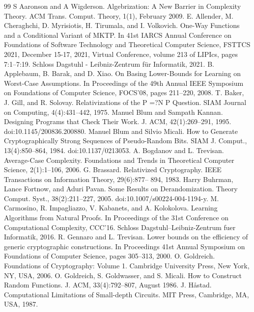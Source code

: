 \documentclass[10pt,a4paper]{article}
\begin{document}
\begin{thebibliography}{99}
 S Aaronson and A Wigderson. Algebrization: A New Barrier in Complexity Theory. ACM Trans. Comput. Theory, 1(1), February 2009.
 E. Allender, M. Cheraghchi, D. Myrisiotis, H. Tirumala, and I. Volkovich. One-Way Functions and a Conditional Variant of MKTP. In 41st IARCS Annual Conference on Foundations of Software Technology and Theoretical Computer Science, FSTTCS 2021, December 15-17, 2021, Virtual Conference, volume 213 of LIPIcs, pages 7:1–7:19. Schloss Dagstuhl - Leibniz-Zentrum für Informatik, 2021.
 B. Applebaum, B. Barak, and D. Xiao. On Basing Lower-Bounds for Learning on Worst-Case Assumptions. In Proceedings of the 49th Annual IEEE Symposium on Foundations of Computer Science, FOCS’08, pages 211–220, 2008.
 T. Baker, J. Gill, and R. Solovay. Relativizations of the P =?N P Question. SIAM Journal on Computing, 4(4):431–442, 1975.
 Manuel Blum and Sampath Kannan. Designing Programs that Check Their Work. J. ACM, 42(1):269–291, 1995. doi:10.1145/200836.200880.
 Manuel Blum and Silvio Micali. How to Generate Cryptographically Strong Sequences of Pseudo-Random Bits. SIAM J. Comput., 13(4):850–864, 1984. doi:10.1137/0213053.
 A. Bogdanov and L. Trevisan. Average-Case Complexity. Foundations and Trends in Theoretical Computer Science, 2(1):1–106, 2006.
 G. Brassard. Relativized Cryptography. IEEE Transactions on Information Theory, 29(6):877– 894, 1983.
 Harry Buhrman, Lance Fortnow, and Aduri Pavan. Some Results on Derandomization. Theory Comput. Syst., 38(2):211–227, 2005. doi:10.1007/s00224-004-1194-y.
 M. Carmosino, R. Impagliazzo, V. Kabanets, and A. Kolokolova. Learning Algorithms from Natural Proofs. In Proceedings of the 31st Conference on Computational Complexity, CCC’16. Schloss Dagstuhl–Leibniz-Zentrum fuer Informatik, 2016.
 R. Gennaro and L. Trevisan. Lower bounds on the efficiency of generic cryptographic constructions. In Proceedings 41st Annual Symposium on Foundations of Computer Science, pages 305–313, 2000.
 O. Goldreich. Foundations of Cryptography: Volume 1. Cambridge University Press, New York, NY, USA, 2006.
 O. Goldreich, S. Goldwasser, and S. Micali. How to Construct Random Functions. J. ACM, 33(4):792–807, August 1986.
 J. Håstad. Computational Limitations of Small-depth Circuits. MIT Press, Cambridge, MA, USA, 1987.

\end{thebibliography}
\end{document}
